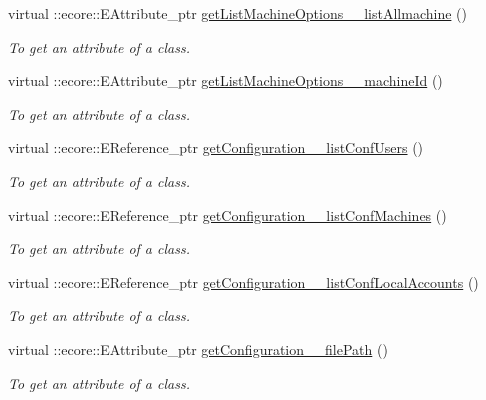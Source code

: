 \begin{DoxyCompactItemize}
virtual ::ecore::EAttribute\_\-ptr \hyperlink{classUMS__Data_1_1UMS__DataPackage_a6918751d800079b2b36916930ba12354}{getListMachineOptions\_\-\_\-listAllmachine} ()
\begin{DoxyCompactList}\small\item\em To get an attribute of a class. \item\end{DoxyCompactList}\item 
virtual ::ecore::EAttribute\_\-ptr \hyperlink{classUMS__Data_1_1UMS__DataPackage_a115c0f689e38a039c31f195bfc7bd4f1}{getListMachineOptions\_\-\_\-machineId} ()
\begin{DoxyCompactList}\small\item\em To get an attribute of a class. \item\end{DoxyCompactList}\item 
virtual ::ecore::EReference\_\-ptr \hyperlink{classUMS__Data_1_1UMS__DataPackage_ab3e2b48cbeab53b4b239c9d07a76379f}{getConfiguration\_\-\_\-listConfUsers} ()
\begin{DoxyCompactList}\small\item\em To get an attribute of a class. \item\end{DoxyCompactList}\item 
virtual ::ecore::EReference\_\-ptr \hyperlink{classUMS__Data_1_1UMS__DataPackage_ad521ced5acc60d6ea24223f41e85ad0b}{getConfiguration\_\-\_\-listConfMachines} ()
\begin{DoxyCompactList}\small\item\em To get an attribute of a class. \item\end{DoxyCompactList}\item 
virtual ::ecore::EReference\_\-ptr \hyperlink{classUMS__Data_1_1UMS__DataPackage_a37d328c7e96d11789973b6013daf6dac}{getConfiguration\_\-\_\-listConfLocalAccounts} ()
\begin{DoxyCompactList}\small\item\em To get an attribute of a class. \item\end{DoxyCompactList}\item 
virtual ::ecore::EAttribute\_\-ptr \hyperlink{classUMS__Data_1_1UMS__DataPackage_a4d5808ada0c9e0daf82b4a44f6cac6c2}{getConfiguration\_\-\_\-filePath} ()
\begin{DoxyCompactList}\small\item\em To get an attribute of a class. \item\end{DoxyCompactList}\item 

\end{DoxyCompactItemize}
